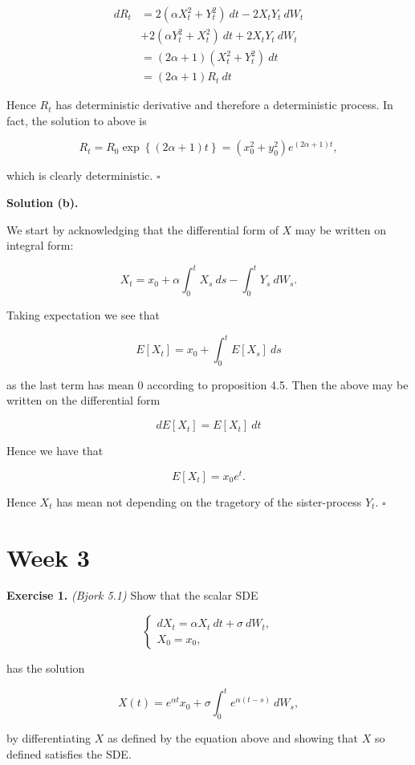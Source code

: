 \documentclass[
]{book}
\begin{document}
\begin{align*}
dR_t&=2(\alpha X_t^2+Y_t^2)\ dt-2X_tY_t\ dW_t\\
&+2(\alpha Y_t^2+X_t^2)\ dt+2X_tY_t\ dW_t\\
&=(2\alpha +1)(X_t^2 + Y_t^2)\ dt\\
&=(2\alpha +1)R_t\ dt
\end{align*}

Hence \(R_t\) has deterministic derivative and therefore a deterministic process. In fact, the solution to above is

\[
R_t=R_0\exp\left\{(2\alpha + 1)t\right\}=(x_0^2+y_0^2)e^{(2\alpha + 1)t},
\]

which is clearly deterministic. \(\square\)

\textbf{Solution (b).}

We start by acknowledging that the differential form of \(X\) may be written on integral form:

\[
X_t=x_0+\alpha\int_0^tX_s\ ds-\int_0^tY_s\ dW_s.
\]

Taking expectation we see that

\[
E[X_t]=x_0+\int_0^tE[X_s]\ ds
\]

as the last term has mean 0 according to proposition 4.5. Then the above may be written on the differential form

\[
dE[X_t]=E[X_t]\ dt
\]

Hence we have that

\[
E[X_t]=x_0e^{t}.
\]

Hence \(X_t\) has mean not depending on the tragetory of the sister-process \(Y_t\). \(\square\)

\hypertarget{week-3}{%
\section{Week 3}\label{week-3}}

\textbf{Exercise 1.} \emph{(Bjork 5.1)} Show that the scalar SDE

\[
\left\{
\begin{matrix}
dX_t=\alpha X_t\ dt + \sigma\ dW_t,\\
X_0 = x_0,
\end{matrix}\right.
\]

has the solution

\[
X(t)=e^{\alpha t}x_0+ \sigma\int_0^te^{\alpha(t-s)}\ dW_s,
\]

by differentiating \(X\) as defined by the equation above and showing that \(X\) so defined satisfies the SDE.
\end{document}
